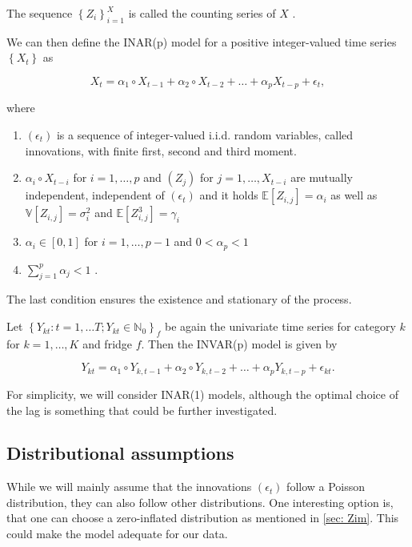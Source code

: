 The sequence  $\left\{Z_i \right\}_{i=1}^X$ is called the counting series of $X$ \cite{Silva:2005}. 

We can then define the INAR(p) model for a positive integer-valued time series $\left\{X_t \right\}$ as

\begin{equation}
X_t = \alpha_1 \circ X_{t-1} + \alpha_2 \circ X_{t-2} + \ldots + \alpha_p X_{t-p} +\epsilon_t ,
\label{eq:Inar(p) model}
\end{equation}

where

\begin{enumerate}
	\item $(\epsilon_t)$ is a sequence of integer-valued i.i.d. random variables, called innovations, with finite first, second and third moment. 
	\item $\alpha_i \circ X_{t-i}$ for $i= 1,\ldots,p$ and $(Z_j)$ for $j=1,\ldots,X_{t-i}$ are mutually independent, independent of $(\epsilon_t)$ and it holds $\mathbb{E}[Z_{i,j}]=\alpha_i$ as well as $\mathbb{V}[Z_{i,j}] = \sigma_i^2$ and $\mathbb{E}[Z_{i,j}^3] = \gamma_i$
	\item $\alpha_i \in [0,1]$ for $i=1,\ldots,p-1$ and $0 < \alpha_p < 1$
	\item $\sum_{j=1}^p \alpha_j < 1$ \cite{Silva:2005}. 
\end{enumerate}


The last condition ensures the existence and stationary of the process. 

Let $\left\{Y_{kt}:t=1,\ldots T; Y_{kt} \in \mathbb{N}_0\right\}_f$ be again the univariate time series for category $k$ for $k=1,\ldots,K$ and fridge $f$. Then the INVAR(p) model is given by

\begin{equation}
Y_{kt} = \alpha_1 \circ Y_{k,t-1} + \alpha_2 \circ Y_{k,t-2} + \ldots + \alpha_p Y_{k,t-p} +\epsilon_{kt}.
\label{eq:Inar(p) model ts}
\end{equation}

For simplicity, we will consider INAR(1) models, although the optimal choice of the lag is something that could be further investigated. 

\subsection{Distributional assumptions}
\label{sec: Inar Distributional assumptions}

While we will mainly assume that the innovations $(\epsilon_t)$ follow a Poisson distribution, they can also follow other distributions. One interesting option is, that one can choose a zero-inflated distribution as mentioned in \ref{sec: Zim}. This could make the model adequate for our data. 



